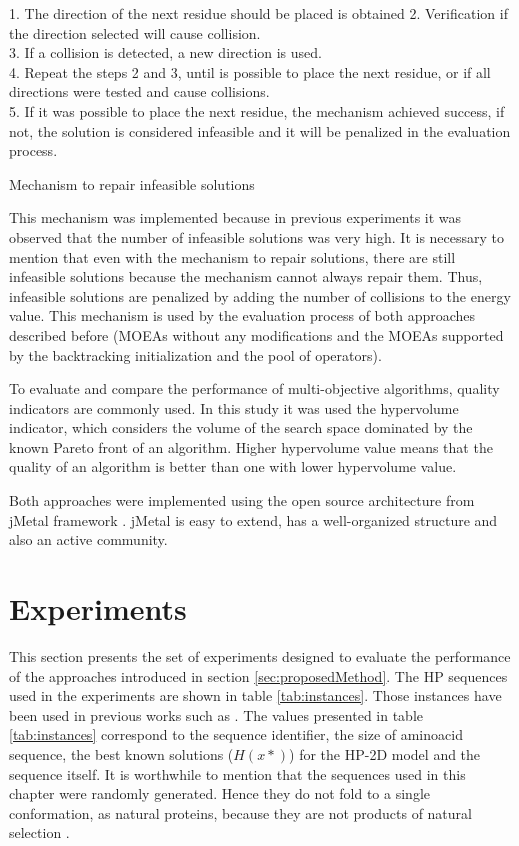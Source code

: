 \begin{algorithm}[h]
	1. The direction of the next residue should be placed is obtained 
	2. Verification if the direction selected will cause collision.\\
	3. If a collision is detected, a new direction is used.\\
	4. Repeat the steps 2 and 3, until is possible to place the next residue, or if all directions were tested and cause collisions.\\
	5. If it was possible to place the next residue, the mechanism achieved success, if not, the solution is considered infeasible and it will be penalized in the evaluation process.
	\caption{Mechanism to repair infeasible solutions}
	\label{algo:reparacao}
\end{algorithm}


This mechanism was implemented because in previous experiments it was observed that the number of infeasible solutions was very high. It is necessary to mention that even with the mechanism to repair solutions, there are still infeasible solutions because the mechanism cannot always repair them. Thus, infeasible solutions are penalized by adding the number of collisions to the energy value. This mechanism is used by the evaluation process of both approaches described before (MOEAs without any modifications and the MOEAs supported by the backtracking initialization and the pool of operators).

To evaluate and compare the performance of multi-objective algorithms, quality indicators are commonly used. In this study it was used the hypervolume indicator, which considers the volume of the search space dominated by the known Pareto front \cite{zitzler2003performance} of an algorithm. Higher hypervolume value means that the quality of an algorithm is better than one with lower hypervolume value.


Both approaches were implemented using the open source architecture from  jMetal framework \cite{durillo2011jmetal}.  jMetal is easy to extend, has a well-organized structure and also an active community. 


\section{Experiments} \label{sec:experiments}


This section presents the set of experiments designed to evaluate the performance of the approaches introduced in section \ref{sec:proposedMethod}. The HP sequences used in the experiments are shown in table \ref{tab:instances}. Those instances have been used in previous works such as \cite{bastolla1997testing,shmygelska2002ant,unger1993genetic,cotta2003protein, santana2004protein,shmygelska2003improved,lesh2003complete}. The values presented in table \ref{tab:instances} correspond to the sequence identifier, the size of aminoacid sequence, the best known solutions ($H(x*)$) for the HP-2D model and the sequence itself. It is worthwhile to mention that the sequences used in this chapter were randomly generated. Hence they do not fold to a single conformation, as natural proteins, because they are not products of natural selection \cite{chan2001perspectives}.

